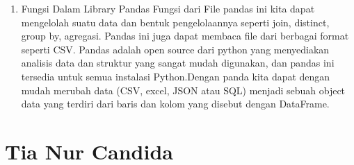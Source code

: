 \begin{enumerate}
\item Fungsi Dalam Library Pandas 
Fungsi dari File pandas ini kita dapat mengelolah suatu data dan bentuk pengelolaannya seperti join, distinct, group by, agregasi. 
Pandas ini juga dapat membaca file dari berbagai format seperti CSV. 
Pandas adalah open source dari python yang menyediakan analisis data dan struktur yang sangat mudah digunakan, 
dan pandas ini tersedia untuk semua instalasi Python.Dengan panda kita dapat dengan mudah merubah data (CSV, excel, JSON atau SQL) 
menjadi sebuah object data yang terdiri dari baris dan kolom yang disebut dengan DataFrame. 

\end{enumerate}

\section{Tia Nur Candida}
